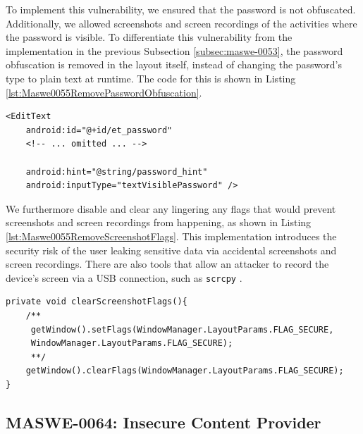 To implement this vulnerability, we ensured that the password is not obfuscated. Additionally, we allowed screenshots and screen recordings of the activities where the password is visible. To differentiate this vulnerability from the implementation in the previous Subsection \ref{subsec:maswe-0053}, the password obfuscation is removed in the layout itself, instead of changing the password's type to plain text at runtime. The code for this is shown in Listing \ref{lst:Maswe0055RemovePasswordObfuscation}.

\vspace{-1pt}

\begin{lstlisting}[style=XMLStyle, float=tbh, captionpos=b, caption={Setting the password \texttt{EditText} to visible password as to remove text obfuscation}, label={lst:Maswe0055RemovePasswordObfuscation}]
<EditText
    android:id="@+id/et_password"
    <!-- ... omitted ... -->
    
    android:hint="@string/password_hint"
    android:inputType="textVisiblePassword" />
\end{lstlisting}

\vspace{-7.5pt}

We furthermore disable and clear any lingering any flags that would prevent screenshots and screen recordings from happening, as shown in Listing \ref{lst:Maswe0055RemoveScreenshotFlags}. This implementation introduces the security risk of the user leaking sensitive data via accidental screenshots and screen recordings. There are also tools that allow an attacker to record the device's screen via a USB connection, such as \texttt{scrcpy} \cite{scrcpy}.

\vspace{-3pt}

\begin{lstlisting}[style=JavaStyle, float=tbh, captionpos=b, caption={Disabling and clearing security flags that prevent screenshots and screen recordings from login and register activities}, label={lst:Maswe0055RemoveScreenshotFlags}]
private void clearScreenshotFlags(){
    /**
     getWindow().setFlags(WindowManager.LayoutParams.FLAG_SECURE,
     WindowManager.LayoutParams.FLAG_SECURE);
     **/
    getWindow().clearFlags(WindowManager.LayoutParams.FLAG_SECURE);
}
\end{lstlisting}

\vspace{-15pt}


\subsection{MASWE-0064: Insecure Content Provider}
\label{subsec:maswe-0064}


